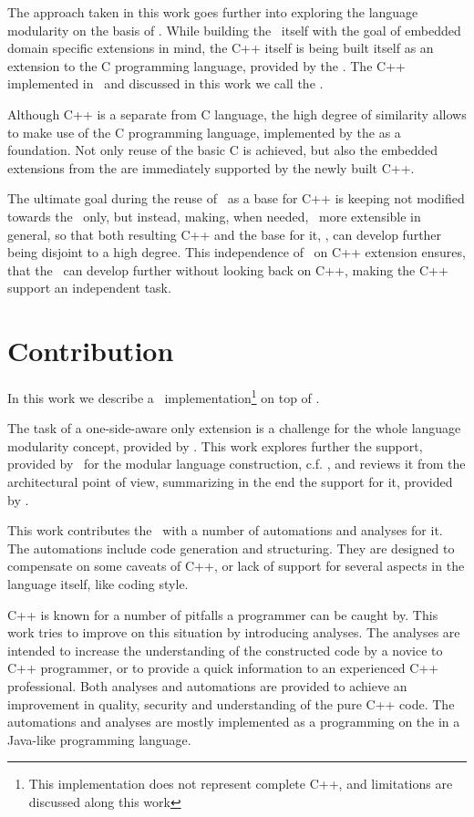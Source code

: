 The approach taken in this work goes further into exploring the language modularity on the basis of \jbmps. While building 
the \cpppl\ itself  with the goal of embedded domain specific extensions in mind, the C++ itself is being built itself as 
an extension to the C programming language, provided by the . The C++ implemented in \jbmps\ and discussed in this 
work we call the \pcpp.

Although C++ is a separate from C language, the high degree of similarity allows to make use of the C programming language,
implemented by the  as a foundation. Not only reuse of the basic C is achieved, but also the embedded extensions from
the  are immediately supported by the newly built C++.

The ultimate goal during the reuse of \mbdr\ as a base for C++ is keeping 
not modified towards the \cpppl\ only, but instead, making, when needed, \mbeddr\  more extensible in general, 
so that both resulting C++ and the base for it, \mbdr,  can develop further being disjoint to a high degree.
This independence of \mbdr\ on C++ extension ensures, that the \mbdp\ can develop further without looking back 
on C++, making the C++ support an independent task.

\section{Contribution}

In this work we describe a \cpppl\ implementation\footnote{This implementation does not represent complete C++, and
limitations are discussed along this work} on top of \mbdp.

The task of a one-side-aware only extension is a challenge for the whole language modularity concept, 
provided by \jbmps. This work explores further the support, provided by \jbmps\ for the modular 
language construction, c.f. \cite{2012_ratiu_modular_dsls_and_analyses}, and reviews it from the architectural point of view,
summarizing in the end the support for it, provided by \jbmps.

This work contributes the \cpppl\ with a number of automations and analyses for it. The automations include code 
generation and structuring. They are designed to compensate on some caveats of C++, or lack of support for 
several aspects in the language itself, like coding style. 

C++ is known for a number of pitfalls a programmer can be caught by. This work tries to improve on this situation by introducing analyses.
The analyses are intended to increase the understanding of the constructed code by a novice to C++ programmer, 
or to provide a quick information to an experienced C++ professional. Both analyses and automations are provided to 
achieve an improvement in quality, security and understanding of the pure C++ code. The automations and analyses 
are mostly implemented as a programming on the  in a Java-like programming language.

